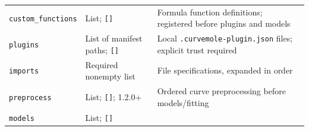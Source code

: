 \documentclass[
  10pt,
  a4paper,
  oneside]{scrreprt}
\begin{document}
\begin{longtable}[]{@{}lll@{}}
\begin{minipage}[t]{0.30\columnwidth}
\texttt{custom\_functions}\strut
\end{minipage} & \begin{minipage}[t]{0.30\columnwidth}\raggedright
List; \texttt{{[}{]}}\strut
\end{minipage} & \begin{minipage}[t]{0.30\columnwidth}\raggedright
Formula function definitions; registered before plugins and models\strut
\end{minipage}\tabularnewline
\begin{minipage}[t]{0.30\columnwidth}\raggedright
\texttt{plugins}\strut
\end{minipage} & \begin{minipage}[t]{0.30\columnwidth}\raggedright
List of manifest paths; \texttt{{[}{]}}\strut
\end{minipage} & \begin{minipage}[t]{0.30\columnwidth}\raggedright
Local \texttt{.curvemole-plugin.json} files; explicit trust
required\strut
\end{minipage}\tabularnewline
\begin{minipage}[t]{0.30\columnwidth}\raggedright
\texttt{imports}\strut
\end{minipage} & \begin{minipage}[t]{0.30\columnwidth}\raggedright
Required nonempty list\strut
\end{minipage} & \begin{minipage}[t]{0.30\columnwidth}\raggedright
File specifications, expanded in order\strut
\end{minipage}\tabularnewline
\begin{minipage}[t]{0.30\columnwidth}\raggedright
\texttt{preprocess}\strut
\end{minipage} & \begin{minipage}[t]{0.30\columnwidth}\raggedright
List; \texttt{{[}{]}}; 1.2.0+\strut
\end{minipage} & \begin{minipage}[t]{0.30\columnwidth}\raggedright
Ordered curve preprocessing before models/fitting\strut
\end{minipage}\tabularnewline
\begin{minipage}[t]{0.30\columnwidth}\raggedright
\texttt{models}\strut
\end{minipage} & \begin{minipage}[t]{0.30\columnwidth}\raggedright
List; \texttt{{[}{]}}\strut
\end{minipage} & \begin{minipage}[t]{0.30\columnwidth}\raggedright

\end{minipage}
\end{longtable}
\end{document}
